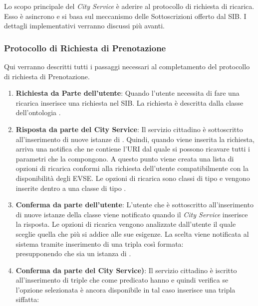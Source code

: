 Lo scopo principale del \emph{City Service} è aderire al protocollo di richiesta di ricarica. Esso è asincrono e si basa sul meccanismo delle Sottoscrizioni offerto dal SIB. I dettagli implementativi verranno discussi più avanti.

\subsubsection{Protocollo di Richiesta di Prenotazione}

Qui verranno descritti tutti i passaggi necessari al completamento del protocollo di richiesta di Prenotazione.


\begin{enumerate}[label=\textbf{\arabic*}]
	\item \textbf{Richiesta da Parte dell'utente}: Quando l'utente necessita di fare una ricarica inserisce una richiesta nel SIB. La richiesta è descritta dalla classe dell'ontologia .
	\item \textbf{Risposta da parte del City Service}: Il servizio cittadino è sottoscritto all'inserimento di nuove istanze di . Quindi, quando viene inserita la richiesta, arriva una notifica che ne contiene l'URI dal quale si possono ricavare tutti i parametri che la compongono. A questo punto viene creata una lista di opzioni di ricarica conformi alla richiesta dell'utente compatibilmente con la disponibilità degli EVSE. Le opzioni di ricarica sono classi di tipo  e vengono inserite dentro a una classe di tipo .
	\item \label{confirmByUser} \textbf{Conferma da parte dell'utente}: L'utente che è sottoscritto all'inserimento di nuove istanze della classe  viene notificato quando il \emph{City Service} inserisce la risposta. Le opzioni di ricarica vengono analizzate dall'utente il quale sceglie quella che più si addice alle sue esigenze. La scelta viene notificata al sistema tramite inserimento di una tripla così formata:
	\\  presupponendo che  sia un istanza di .
	\item \textbf{Conferma da parte del City Service)}: Il servizio cittadino è iscritto all'inserimento di triple che come predicato hanno  e quindi verifica se l'opzione selezionata è ancora disponibile in tal caso inserisce una tripla siffatta:

\end{enumerate}
